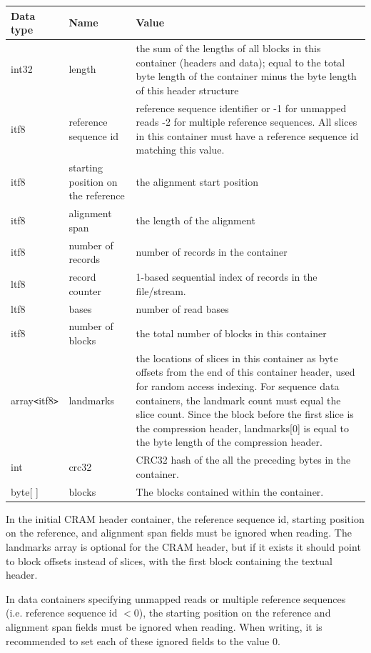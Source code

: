 \documentclass[a4paper]{article}
\begin{document}
\begin{tabular}{|l|>{\raggedright}p{120pt}|>{\raggedright}p{260pt}|}
\hline
\textbf{Data type} & \textbf{Name} & \textbf{Value}
\tabularnewline
\hline
int32 & length & the sum of the lengths of all blocks in this container (headers and data); 
equal to the total byte length of the container minus the byte length of this header structure\tabularnewline
\hline
itf8 & reference sequence id & reference sequence identifier  or\linebreak{}
-1 for unmapped reads\linebreak{}
-2 for multiple reference sequences.\linebreak{}
All slices in this container must have a reference sequence id matching this value.\tabularnewline
\hline
itf8 & starting position on the reference & the alignment start position\tabularnewline
\hline
itf8 & alignment span & the length of the alignment\tabularnewline
\hline
itf8 & number of records & number of records in the container\tabularnewline
\hline
ltf8 & record counter & 1-based sequential index of records in the file/stream.\tabularnewline
\hline
ltf8 & bases & number of read bases\tabularnewline
\hline
itf8 & number of blocks & the total number of blocks in this container\tabularnewline
\hline
array\texttt{<}itf8\texttt{>} & landmarks & the locations of slices in this container as byte offsets from the end of
this container header, used for random access indexing.
For sequence data containers, the landmark count must equal the slice count.\linebreak{}
Since the block before the first slice is the compression header,
landmarks[0] is equal to the byte length of the compression header.\tabularnewline
\hline
int & crc32 & CRC32 hash of the all the preceding bytes in the container.\tabularnewline
\hline
byte[ ] & blocks & The blocks contained within the container.\tabularnewline
\hline
\end{tabular}

In the initial CRAM header container, the reference sequence id,
starting position on the reference, and alignment span fields must be
ignored when reading. The landmarks array is optional for the CRAM
header, but if it exists it should point to block offsets instead of
slices, with the first block containing the textual header.

In data containers specifying unmapped reads or multiple reference
sequences (i.e. reference sequence id $< 0$), the starting position on
the reference and alignment span fields must be ignored when
reading. When writing, it is recommended to set each of these ignored
fields to the value 0.
\end{document}
